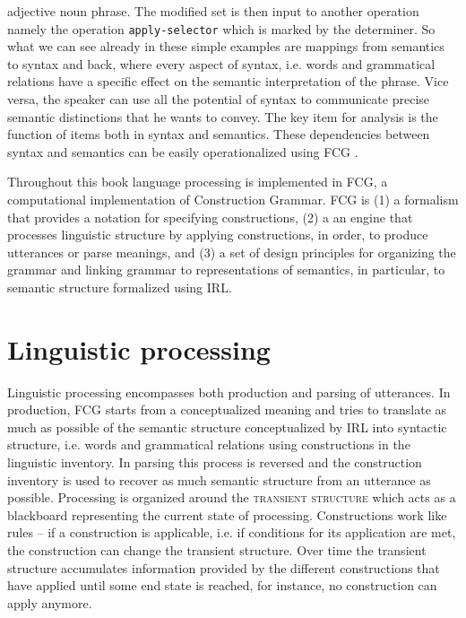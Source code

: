 adjective noun phrase. The modified set is then input to another
operation namely the operation {\footnotesize\tt apply-selector}
which is marked by the determiner. So what we can see already in 
these simple examples are mappings 
from semantics to syntax and back, where every aspect of syntax,
i.e. words and grammatical relations
have a specific effect on the semantic interpretation of the phrase.
Vice versa, the speaker can use all the potential of syntax to
communicate precise semantic distinctions that he wants to convey.
The key item for analysis is the function of items 
both in syntax and semantics. 
These dependencies between syntax and semantics can be easily
operationalized using FCG
\citep{beule2005hierarchy,steels2005linking}. 

Throughout this book language processing is implemented
in FCG, a computational implementation of Construction Grammar. FCG is (1) a formalism
that provides a notation for specifying constructions, (2) a
an engine that processes linguistic structure by applying constructions, 
in order, to produce utterances or parse meanings, and (3) a set of design principles
for organizing the grammar and linking grammar to 
representations of semantics, in particular, to semantic structure 
formalized using IRL. 

\section{Linguistic processing}
Linguistic processing encompasses both production and parsing
of utterances. In production, FCG starts from a conceptualized
meaning and tries to translate as much as possible of
the semantic structure conceptualized by IRL into syntactic structure, 
i.e. words and grammatical relations using constructions in the linguistic inventory. 
In parsing this process is reversed and the construction inventory is used
to recover as much semantic structure from an utterance as possible.
Processing is organized around the \textsc{transient structure}
which acts as a blackboard representing the current state of processing.
Constructions work like rules -- if a construction is applicable,
i.e. if conditions for its application are met, the construction
can change the transient structure.
Over time the transient structure accumulates information provided by the different constructions
that have applied until some end state is reached, for instance,
no construction can apply anymore.

